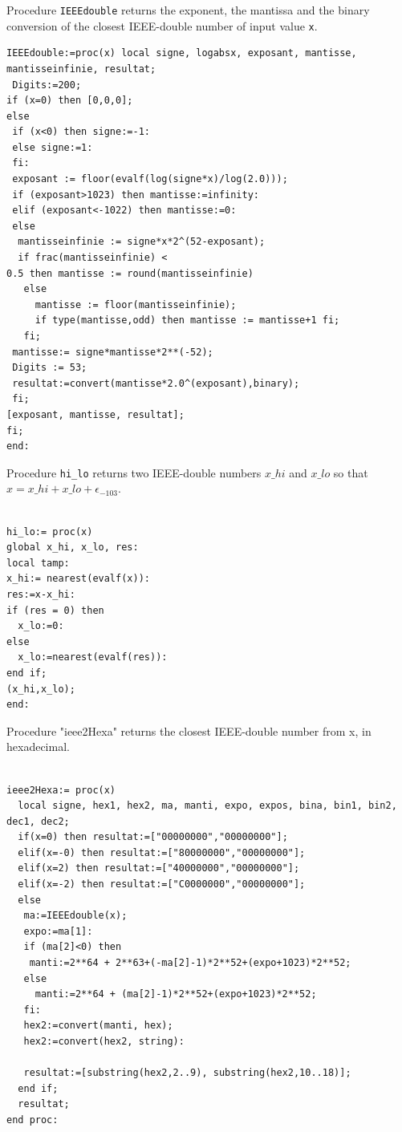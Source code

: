 Procedure \texttt{IEEEdouble} returns the exponent, the mantissa and the
binary conversion of the closest IEEE-double number of input value \texttt{x}.

\begin{lstlisting}[caption={IEEEdouble},firstnumber=1]
IEEEdouble:=proc(x) local signe, logabsx, exposant, mantisse, mantisseinfinie, resultat; 
 Digits:=200;
if (x=0) then [0,0,0]; 
else 
 if (x<0) then signe:=-1:
 else signe:=1:
 fi:
 exposant := floor(evalf(log(signe*x)/log(2.0)));
 if (exposant>1023) then mantisse:=infinity:
 elif (exposant<-1022) then mantisse:=0:
 else 
  mantisseinfinie := signe*x*2^(52-exposant);
  if frac(mantisseinfinie) <
0.5 then mantisse := round(mantisseinfinie)
   else
     mantisse := floor(mantisseinfinie);
     if type(mantisse,odd) then mantisse := mantisse+1 fi;
   fi;
 mantisse:= signe*mantisse*2**(-52);
 Digits := 53;
 resultat:=convert(mantisse*2.0^(exposant),binary);
 fi;
[exposant, mantisse, resultat];
fi;
end:
\end{lstlisting}

Procedure \texttt{hi\_lo} returns two IEEE-double numbers $x\_hi$ and $x\_lo$ so that $x = x\_hi + x\_lo + \epsilon_{-103}$.

\begin{lstlisting}[caption={hi\_lo},firstnumber=1]

hi_lo:= proc(x)
global x_hi, x_lo, res:
local tamp:
x_hi:= nearest(evalf(x)):
res:=x-x_hi:
if (res = 0) then
  x_lo:=0:
else
  x_lo:=nearest(evalf(res)):
end if;
(x_hi,x_lo);
end:
\end{lstlisting}
\vspace{0.5cm}



Procedure "ieee2Hexa" returns the closest IEEE-double number from x, in hexadecimal.

\begin{lstlisting}[caption={ieee2Hexa},firstnumber=1]

ieee2Hexa:= proc(x)
  local signe, hex1, hex2, ma, manti, expo, expos, bina, bin1, bin2, dec1, dec2;
  if(x=0) then resultat:=["00000000","00000000"];
  elif(x=-0) then resultat:=["80000000","00000000"];
  elif(x=2) then resultat:=["40000000","00000000"];
  elif(x=-2) then resultat:=["C0000000","00000000"];
  else
   ma:=IEEEdouble(x);
   expo:=ma[1]:
   if (ma[2]<0) then 
    manti:=2**64 + 2**63+(-ma[2]-1)*2**52+(expo+1023)*2**52;
   else 
     manti:=2**64 + (ma[2]-1)*2**52+(expo+1023)*2**52;
   fi:
   hex2:=convert(manti, hex); 
   hex2:=convert(hex2, string):  
  
   resultat:=[substring(hex2,2..9), substring(hex2,10..18)];
  end if;
  resultat;
end proc:
\end{lstlisting}
\vspace{0.5cm}

